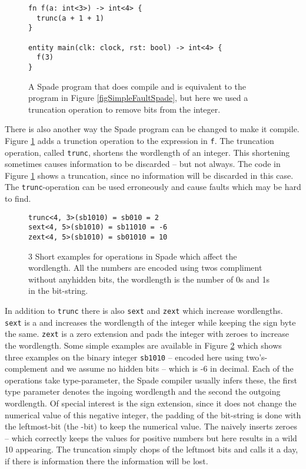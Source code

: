 \begin{figure}[h!]
\centering
  \begin{verbatim}
fn f(a: int<3>) -> int<4> {
  trunc(a + 1 + 1)
}

entity main(clk: clock, rst: bool) -> int<4> {
  f(3)
}
\end{verbatim}
  \caption{ A Spade program that does compile and is equivalent to the program in Figure \ref{figSimpleFaultSpade}, but here we used a truncation operation to remove bits from the integer.}
\label{figSimpleTruncSpade}
\end{figure}

There is also another way the Spade program can be changed to make it compile. Figure \ref{figSimpleTruncSpade} adds a trunction operation to the expression in \verb+f+. The truncation operation, called \verb+trunc+, shortens the wordlength of an integer. This shortening sometimes causes information to be discarded -- but not always. The code in Figure \ref{figSimpleTruncSpade} shows a  truncation, since no information will be discarded in this case. The \verb+trunc+-operation can be used erroneously and cause faults which may be hard to find.

\begin{figure}[h!]
\centering
\begin{verbatim}
trunc<4, 3>(sb1010) = sb010 = 2
sext<4, 5>(sb1010) = sb11010 = -6
zext<4, 5>(sb1010) = sb01010 = 10
\end{verbatim}
  \caption{3 Short examples for operations in Spade which affect the wordlength. All the numbers are encoded using twos compliment without anyhidden bits, the wordlength is the number of 0s and 1s in the bit-string.}
\label{figSext}
\end{figure}

In addition to \verb+trunc+ there is also \verb+sext+ and \verb+zext+ which increase wordlengths. \verb+sext+ is a  and increases the wordlength of the integer while keeping the sign byte the same. \verb+zext+ is a zero extension and pads the integer with zeroes to increase the wordlength. Some simple examples are available in Figure \ref{figSext} which shows three examples on the binary integer \verb+sb1010+ -- encoded here using two's-complement and we assume no hidden bits --  which is -6 in decimal. Each of the operations take type-parameter, the Spade compiler usually infers these, the first type parameter denotes the ingoing wordlength and the second the outgoing wordlength. Of special interest is the sign extension, since it does not change the numerical value of this negative integer, the padding of the bit-string is done with the leftmost-bit (the -bit) to keep the numerical value. The  naively inserts zeroes -- which correctly keeps the values for positive numbers but here results in a wild 10 appearing. The truncation simply chops of the leftmost bits and calls it a day, if there is information there the information will be lost.

